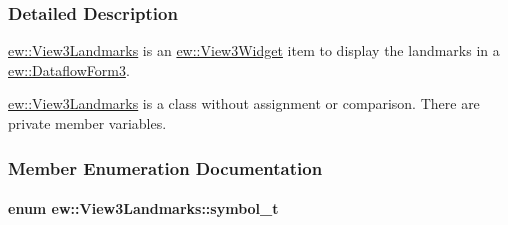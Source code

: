 \subsubsection{Detailed Description}
\hyperlink{classew_1_1View3Landmarks}{ew::View3Landmarks} is an \hyperlink{classew_1_1View3Widget}{ew::View3Widget} item to display the landmarks in a \hyperlink{classew_1_1DataflowForm3}{ew::DataflowForm3}.

\hyperlink{classew_1_1View3Landmarks}{ew::View3Landmarks} is a class without assignment or comparison. There are private member variables. 

\subsubsection{Member Enumeration Documentation}
\hypertarget{classew_1_1View3Landmarks_a1568c52b9714e8042cfdc7a1835413c4}{
\paragraph[{symbol\_\-t}]{\setlength{\rightskip}{0pt plus 5cm}enum {\bf ew::View3Landmarks::symbol\_\-t}}\hfill}
\label{classew_1_1View3Landmarks_a1568c52b9714e8042cfdc7a1835413c4}
